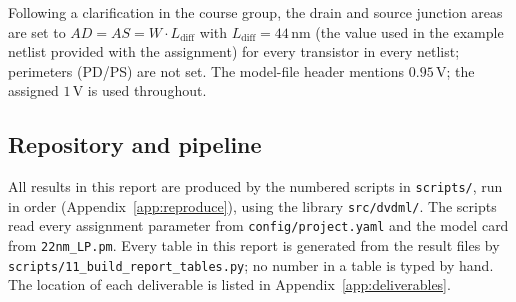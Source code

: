Following a clarification in the course group, the drain and source junction areas are set to $AD=AS=W\cdot L_{\mathrm{diff}}$ with
$L_{\mathrm{diff}}=44\,\mathrm{nm}$ (the value used in the example netlist provided with the assignment) for every transistor in every netlist; perimeters (PD/PS) are not set.
The model-file header mentions $0.95\,\mathrm{V}$; the assigned $1\,\mathrm{V}$ is used throughout.

\subsection{Repository and pipeline}
All results in this report are produced by the numbered scripts in \texttt{scripts/}, run in order (Appendix~\ref{app:reproduce}), using the library
\texttt{src/dvdml/}. The scripts read every assignment parameter from \texttt{config/project.yaml} and the model card from \texttt{22nm\_LP.pm}.
Every table in this report is generated from the result files by \texttt{scripts/11\_build\_report\_tables.py}; no number in a table is typed by hand.
The location of each deliverable is listed in Appendix~\ref{app:deliverables}.
